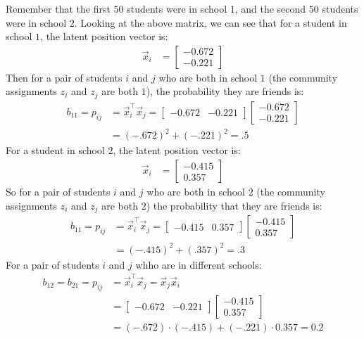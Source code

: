 \documentclass[letterpaper,10pt,english]{jupyterBook}
\begin{document}
\sphinxAtStartPar
Remember that the first \(50\) students were in school \(1\), and the second \(50\) students were in school \(2\). Looking at the above matrix, we can see that for a student in school \(1\), the latent position vector is:
\begin{align*}
    \vec x_i &= \begin{bmatrix}
        -0.672 \\
        -0.221
    \end{bmatrix}
\end{align*}
\sphinxAtStartPar
Then for a pair of students \(i\) and \(j\) who are both in school \(1\) (the community assignments \(z_i\) and \(z_j\) are both \(1\)), the probability they are friends is:
\begin{align*}
    b_{11} = p_{ij} &= \vec x_i^\top \vec x_j = \begin{bmatrix}
        -0.672 &
        -0.221
    \end{bmatrix}\begin{bmatrix}
        -0.672 \\
        -0.221
    \end{bmatrix} \\
    &= (-.672)^2 + (-.221)^2 = .5
\end{align*}
\sphinxAtStartPar
For a student in school \(2\), the latent position vector is:
\begin{align*}
    \vec x_i &= \begin{bmatrix}
        -0.415 \\
        0.357
    \end{bmatrix}
\end{align*}
\sphinxAtStartPar
So for a pair of students \(i\) and \(j\) who are both in school \(2\) (the community assignments \(z_i\) and \(z_j\) are both \(2\)) the probability that they are friends is:
\begin{align*}
    b_{11} = p_{ij} &= \vec x_i^\top \vec x_j = \begin{bmatrix}
        -0.415 &
        0.357
    \end{bmatrix}\begin{bmatrix}
        -0.415 \\
        0.357
    \end{bmatrix} \\
    &= (-.415)^2 + (.357)^2 = .3
\end{align*}
\sphinxAtStartPar
For a pair of students \(i\) and \(j\) whho are in different schools:
\begin{align*}
b_{12} =  b_{21} = p_{ij} &= \vec x_i^\top \vec x_j = \vec x_j \vec x_i \\
&= \begin{bmatrix}
        -0.672 &
        -0.221
    \end{bmatrix}\begin{bmatrix}
        -0.415 \\
        0.357
    \end{bmatrix} \\
    &= (-.672)\cdot(-.415) + (-.221)\cdot 0.357 = 0.2
\end{align*}
\end{document}
